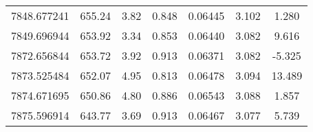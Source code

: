 \begin{table}
\begin{tabular}{ccccccc}
7848.677241 & 655.24 & 3.82 & 0.848 & 0.06445 & 3.102 & 1.280 \\
7849.696944 & 653.92 & 3.34 & 0.853 & 0.06440 & 3.082 & 9.616 \\
7872.656844 & 653.72 & 3.92 & 0.913 & 0.06371 & 3.082 & -5.325 \\
7873.525484 & 652.07 & 4.95 & 0.813 & 0.06478 & 3.094 & 13.489 \\
7874.671695 & 650.86 & 4.80 & 0.886 & 0.06543 & 3.088 & 1.857 \\
7875.596914 & 643.77 & 3.69 & 0.913 & 0.06467 & 3.077 & 5.739 \\
\hline
\end{tabular}
\end{table}
